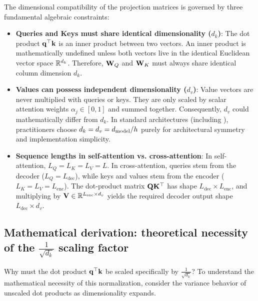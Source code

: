 \documentclass[../../main.tex]{subfiles}
\begin{document}
The dimensional compatibility of the projection matrices is governed by three fundamental algebraic constraints:
\begin{itemize}
    \item \textbf{Queries and Keys must share identical dimensionality ($d_k$)}: The dot product $\mathbf{q}^\top \mathbf{k}$ is an inner product between two vectors. An inner product is mathematically undefined unless both vectors live in the identical Euclidean vector space $\mathbb{R}^{d_k}$. Therefore, $\mathbf{W}_Q$ and $\mathbf{W}_K$ must always share identical column dimension $d_k$.
    \item \textbf{Values can possess independent dimensionality ($d_v$)}: Value vectors are never multiplied with queries or keys. They are only scaled by scalar attention weights $\alpha_j \in [0, 1]$ and summed together. Consequently, $d_v$ could mathematically differ from $d_k$. In standard architectures (including \cite{vaswani2017}), practitioners choose $d_k = d_v = d_{\text{model}} / h$ purely for architectural symmetry and implementation simplicity.
    \item \textbf{Sequence lengths in self-attention vs. cross-attention}: In self-attention, $L_Q = L_K = L_V = L$. In cross-attention, queries stem from the decoder ($L_Q = L_{\text{dec}}$), while keys and values stem from the encoder ($L_K = L_V = L_{\text{enc}}$). The dot-product matrix $\mathbf{Q} \mathbf{K}^\top$ has shape $L_{\text{dec}} \times L_{\text{enc}}$, and multiplying by $\mathbf{V} \in \mathbb{R}^{L_{\text{enc}} \times d_v}$ yields the required decoder output shape $L_{\text{dec}} \times d_v$.
\end{itemize}

\subsection{Mathematical derivation: theoretical necessity of the \texorpdfstring{$\frac{1}{\sqrt{d_k}}$}{1/sqrt(dk)} scaling factor}
\label{subsec:scaling_factor_derivation}

Why must the dot product $\mathbf{q}^\top \mathbf{k}$ be scaled specifically by $\frac{1}{\sqrt{d_k}}$? To understand the mathematical necessity of this normalization, consider the variance behavior of unscaled dot products as dimensionality expands.
\end{document}

